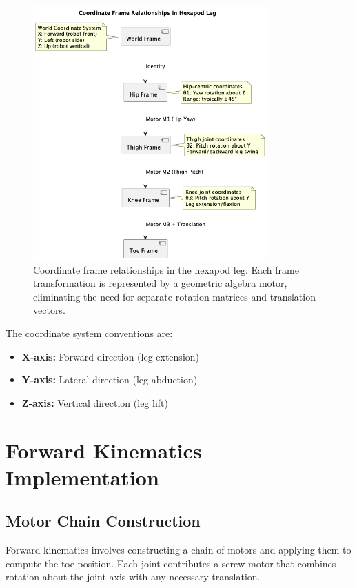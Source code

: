 \documentclass[11pt]{article}
\begin{document}
\begin{figure}[H]
    \centering
    \includegraphics[width=0.8\textwidth]{illustrations/coordinate_frames.png}
    \caption{Coordinate frame relationships in the hexapod leg. Each frame transformation is represented by a geometric algebra motor, eliminating the need for separate rotation matrices and translation vectors.}
    \label{fig:coordinate_frames}
\end{figure}

The coordinate system conventions are:
\begin{itemize}
    \item \textbf{X-axis:} Forward direction (leg extension)
    \item \textbf{Y-axis:} Lateral direction (leg abduction)  
    \item \textbf{Z-axis:} Vertical direction (leg lift)
\end{itemize}

\section{Forward Kinematics Implementation}

\subsection{Motor Chain Construction}

Forward kinematics involves constructing a chain of motors and applying them to compute the toe position. Each joint contributes a screw motor that combines rotation about the joint axis with any necessary translation.
\end{document}
